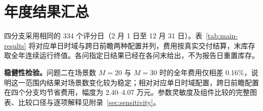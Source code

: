 \section{年度结果汇总}\label{sec:results}
四分支采用相同的 334 个评分日（2 月 1 日至 12 月 31 日）。表~\ref{tab:main-results} 将对应单日时域与跨日前瞻两种配置并列，费用按真实交付结算，末库存取全年连续运行终值。各问指定日结果已经在各问末给出，不为报告日重置库存。


\textbf{稳健性检验。}问题二在场景数 $M=20$ 与 $M=30$ 时的全年费用仅相差 0.16\%，说明这一范围内结果对场景数变化较为稳定；相对对应单日时域配置，跨日前瞻配置在四个分支均节省费用，幅度为 2.40--4.07 万元。参数灵敏度及组件比较的完整图表、比较口径与逐项解释见附录~\ref{sec:sensitivity}。
